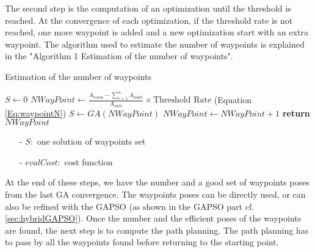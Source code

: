 The second step is the computation of an optimization until the threshold is reached. At the convergence of each optimization, if the threshold rate is not reached, one more waypoint is added and a new optimization start with an extra waypoint. The algorithm used to estimate the number of waypoints is explained in the "Algorithm 1 Estimation of the number of waypoints".  \\
\begin{algorithm}{}
\caption{Estimation of the number of waypoints}\label{alg:euclid}
\begin{algorithmic}[6]
 \State $S\gets 0$
  \State $NWayPoint\gets \frac{ A_{room} - \sum_{i=1}^n A_{wall i} }{A_{cam}} \times \mbox{Threshold Rate} 
 $  (Equation \ref{Eq:waypointN})
	 \State $S \gets GA(NWayPoint)$
	  \State $NWayPoint\gets NWayPoint+1$
  \EndWhile\label{endwhile}
\State \textbf{return} $NWayPoint$
\EndProcedure
\end{algorithmic}
\end{algorithm}
\begin{itemize}
\item[-] $S:$ one solution of waypoints set 
\item[-] $evalCost:$ cost function  
\end{itemize}
At the end of these steps, we have the number and a good set of waypoints poses from the last GA convergence. The waypoints poses can be directly used, or can also be refined with the GAPSO (as shown in the GAPSO part cf. \ref{sec:hybridGAPSO}). Once the number and the efficient poses of the waypoints are found, the next step is to compute the path planning. The path planning has to pass by all the waypoints found before returning to the starting point.  
	
 
